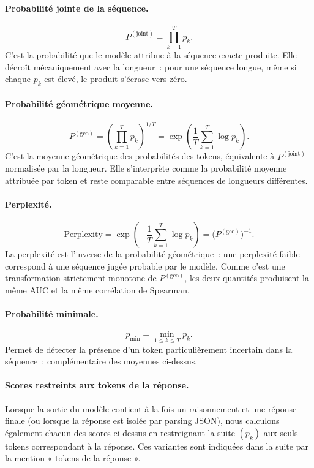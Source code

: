 \documentclass[12pt,a4paper]{article}
\begin{document}
\paragraph{Probabilité jointe de la séquence.}
\[
P^{(\text{joint})} = \prod_{k=1}^{T} p_k.
\]
C'est la probabilité que le modèle attribue à la séquence exacte produite. Elle décroît mécaniquement avec la longueur~: pour une séquence longue, même si chaque $p_k$ est élevé, le produit s'écrase vers zéro.

\paragraph{Probabilité géométrique moyenne.}
\[
P^{(\text{geo})} = \left(\prod_{k=1}^{T} p_k\right)^{1/T} = \exp\!\left(\frac{1}{T}\sum_{k=1}^{T}\log p_k\right).
\]
C'est la moyenne géométrique des probabilités des tokens, équivalente à $P^{(\text{joint})}$ normalisée par la longueur. Elle s'interprète comme la probabilité moyenne attribuée par token et reste comparable entre séquences de longueurs différentes.

\paragraph{Perplexité.}
\[
\mathrm{Perplexity} = \exp\!\left(-\frac{1}{T}\sum_{k=1}^{T}\log p_k\right) = \big(P^{(\text{geo})}\big)^{-1}.
\]
La perplexité est l'inverse de la probabilité géométrique~: une perplexité faible correspond à une séquence jugée probable par le modèle. Comme c'est une transformation strictement monotone de $P^{(\text{geo})}$, les deux quantités produisent la même AUC et la même corrélation de Spearman.

\paragraph{Probabilité minimale.}
\[
p_{\min} = \min_{1 \leq k \leq T} p_k.
\]
Permet de détecter la présence d'un token particulièrement incertain dans la séquence~; complémentaire des moyennes ci-dessus.

\paragraph{Scores restreints aux tokens de la réponse.}
Lorsque la sortie du modèle contient à la fois un raisonnement et une réponse finale (ou lorsque la réponse est isolée par parsing JSON), nous calculons également chacun des scores ci-dessus en restreignant la suite $(p_k)$ aux seuls tokens correspondant à la réponse. Ces variantes sont indiquées dans la suite par la mention « tokens de la réponse ».
\end{document}
